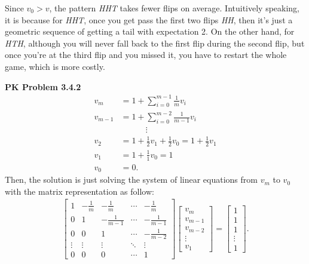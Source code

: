 \documentclass{article}
\begin{document}
Since $v_0 > v$, the pattern \emph{HHT} takes fewer flips on average. 
Intuitively speaking, it is because for \emph{HHT}, once you get pass the first two flips \emph{HH}, then it's just a geometric sequence of getting a tail with expectation 2.
On the other hand, for \emph{HTH}, although you will never fall back to the first flip during the second flip, but once you're at the third flip and you missed it, you have to restart the whole game, which is more costly.
\bigbreak


\textbf{PK Problem 3.4.2}
\begin{align}
    v_m & = 1 + \sum_{i=0}^{m-1}\frac{1}{m}v_i \nonumber \\
    v_{m-1} & = 1 + \sum_{i=0}^{m-2}\frac{1}{m-1}v_i \nonumber \\
    & \quad\qquad \vdots \nonumber \\
    v_2 & = 1 + \frac{1}{2}v_1 + \frac{1}{2} v_0 = 1 + \frac{1}{2}v_1 \nonumber \\
    v_1 & = 1 + \frac{1}{1}v_0  = 1 \nonumber \\
    v_0 & = 0. \nonumber
\end{align}
Then, the solution is just solving the system of linear equations from $v_m$ to $v_0$ with the matrix representation as follow:
\begin{align}
    \begin{bmatrix}
        1 & -\frac{1}{m} & -\frac{1}{m} & \cdots & -\frac{1}{m} \\
        0 & 1 & -\frac{1}{m-1} & \cdots & -\frac{1}{m-1} \\
        0 & 0 & 1 & \cdots & -\frac{1}{m-2} \\
        \vdots & \vdots & \vdots & \ddots & \vdots \\
        0 & 0 & 0 & \cdots & 1
    \end{bmatrix}
    \begin{bmatrix}
        v_m \\
        v_{m-1} \\
        v_{m-2} \\
        \vdots \\
        v_1
    \end{bmatrix} = 
    \begin{bmatrix}
        1 \\
        1 \\
        1 \\
        \vdots \\
        1
    \end{bmatrix}. \nonumber
\end{align}
\end{document}
